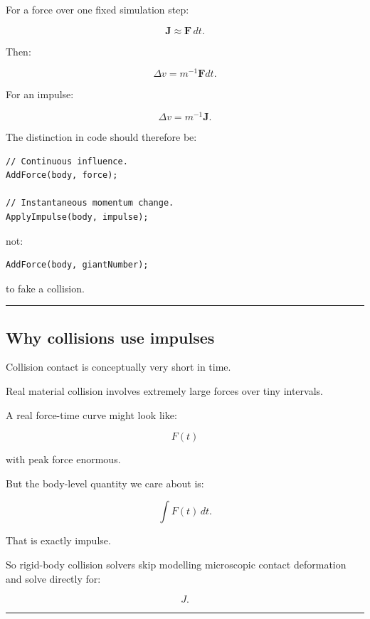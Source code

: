 For a force over one fixed simulation step:

\[
\mathbf J
\approx
\mathbf F\,dt.
\]

Then:

\[
\Delta v
=
m^{-1}\mathbf Fdt.
\]

For an impulse:

\[
\Delta v
=
m^{-1}\mathbf J.
\]

The distinction in code should therefore be:

\begin{verbatim}
// Continuous influence.
AddForce(body, force);

// Instantaneous momentum change.
ApplyImpulse(body, impulse);
\end{verbatim}

not:

\begin{verbatim}
AddForce(body, giantNumber);
\end{verbatim}

to fake a collision.

\begin{center}\rule{0.5\linewidth}{0.5pt}\end{center}

\subsection{Why collisions use impulses}\label{06-engine-ii-ch036-why-collisions-use-impulses}

\hypertarget{06-engine-ii-ch036-why-collisions-use-impulses}{}

Collision contact is conceptually very short in time.

Real material collision involves extremely large forces over tiny intervals.

A real force-time curve might look like:

\[
F(t)
\]

with peak force enormous.

But the body-level quantity we care about is:

\[
\int F(t)\,dt.
\]

That is exactly impulse.

So rigid-body collision solvers skip modelling microscopic contact deformation and solve directly for:

\[
J.
\]

\begin{center}\rule{0.5\linewidth}{0.5pt}\end{center}

